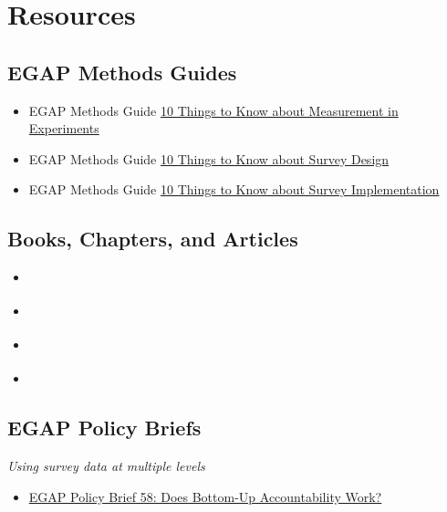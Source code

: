 \documentclass[12pt,]{book}
\providecommand{\tightlist}{%
  \setlength{\itemsep}{0pt}\setlength{\parskip}{0pt}}
\begin{document}
\hypertarget{resources-6}{%
\section{Resources}\label{resources-6}}

\hypertarget{egap-methods-guides-6}{%
\subsection{EGAP Methods Guides}\label{egap-methods-guides-6}}

\begin{itemize}
\item
  EGAP Methods Guide \href{https://egap.org/resource/10-things-to-know-about-measurement-in-experiments/}{10 Things to Know about Measurement in Experiments}
\item
  EGAP Methods Guide \href{https://egap.org/resource/10-things-to-know-about-survey-design/}{10 Things to Know about Survey Design}
\item
  EGAP Methods Guide \href{https://egap.org/resource/10-things-to-know-about-survey-implementation/}{10 Things to Know about Survey Implementation}
\end{itemize}

\hypertarget{books-chapters-and-articles-4}{%
\subsection{Books, Chapters, and Articles}\label{books-chapters-and-articles-4}}

\begin{itemize}
\item
  \autocite{adcocoll:2001}
\item
  \autocite{scacco_can_2018}
\item
  \autocite{shadish2002experimental}
\item
  \autocite{vicente_is_2014}
\end{itemize}

\hypertarget{egap-policy-briefs-2}{%
\subsection{EGAP Policy Briefs}\label{egap-policy-briefs-2}}

\emph{Using survey data at multiple levels}

\begin{itemize}
\tightlist
\item
  \href{https://egap.org/resource/does-bottom-up-accountability-work-evidence-from-uganda/}{EGAP Policy Brief 58: Does Bottom-Up Accountability Work?}
\end{itemize}
\end{document}
